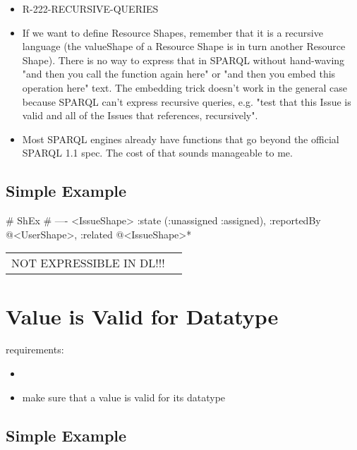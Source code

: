 \documentclass{llncs}
\newenvironment{DL}{
	\begin{center}
  \begin{tabular}{r l}

}{
  \end{tabular}
	\end{center}
}
\begin{document}
\begin{itemize}
	\item R-222-RECURSIVE-QUERIES
\end{itemize}



\begin{itemize}
	\item If we want to define Resource Shapes, remember that it is a recursive
language (the valueShape of a Resource Shape is in turn another
Resource Shape). There is no way to express that in SPARQL without
hand-waving "and then you call the function again here" or "and then
you embed this operation here" text.  The embedding trick doesn't work
in the general case because SPARQL can't express recursive queries,
e.g. "test that this Issue is valid and all of the Issues that
references, recursively".
  \item Most SPARQL engines already have
functions that go beyond the official SPARQL 1.1 spec. The cost of that
sounds manageable to me.
\end{itemize}

\subsection{Simple Example}

\begin{ex}
# ShEx
# ----
<IssueShape> {
    :state (:unassigned :assigned),
    :reportedBy @<UserShape>,
    :related @<IssueShape>*
}
\end{ex}

\begin{DL}
NOT EXPRESSIBLE IN DL!!!
\end{DL}

\section{Value is Valid for Datatype}

requirements:

\begin{itemize}
	\item 
\end{itemize}



\begin{itemize}
	\item make sure that a value is valid for its datatype
\end{itemize}

\subsection{Simple Example}
\end{document}
